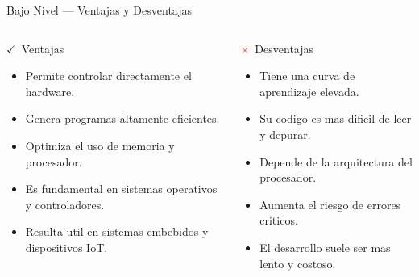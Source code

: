 \documentclass[10pt, aspectratio=169]{beamer}
\begin{document}
	\begin{frame}{Bajo Nivel --- Ventajas y Desventajas}
		\begin{columns}
			\begin{block}{\textcolor{unemiNaranja}{$\checkmark$}\ Ventajas}
				\begin{itemize}
					\item Permite controlar directamente el hardware.
					\item Genera programas altamente eficientes.
					\item Optimiza el uso de memoria y procesador.
					\item Es fundamental en sistemas operativos y controladores.
					\item Resulta util en sistemas embebidos y dispositivos IoT.
				\end{itemize}
			\end{block}
			
			\begin{block}{\textcolor{red}{$\times$}\ Desventajas}
				\begin{itemize}
					\item Tiene una curva de aprendizaje elevada.
					\item Su codigo es mas dificil de leer y depurar.
					\item Depende de la arquitectura del procesador.
					\item Aumenta el riesgo de errores criticos.
					\item El desarrollo suele ser mas lento y costoso.
				\end{itemize}
			\end{block}
		\end{columns}
	\end{frame}
	
\end{document}
